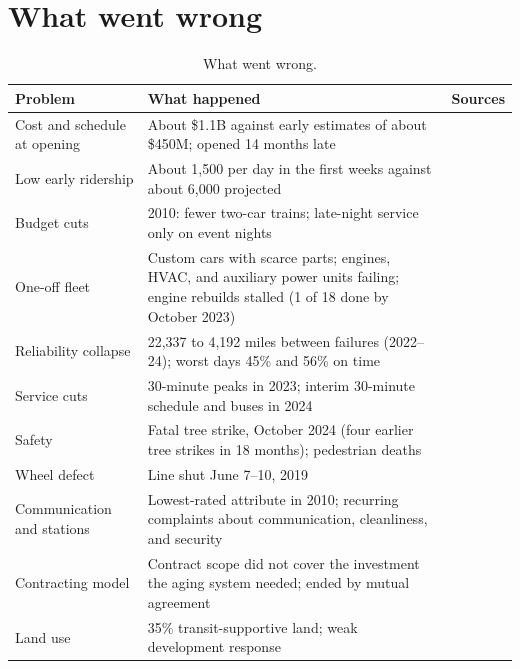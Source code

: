\documentclass[11pt]{article}
\begin{document}
\section{What went wrong}\label{sec:wrong}
\begin{table}[ht]\centering\small
\begin{tabularx}{\textwidth}{@{}p{3.6cm}L p{2.5cm}@{}}
\toprule
Problem & What happened & Sources \\
\midrule
Cost and schedule at opening & About \$1.1B against early estimates of about \$450M; opened 14 months late & \citep{camdenhistory2004,reason2004} \\
Low early ridership & About 1{,}500 per day in the first weeks against about 6{,}000 projected & \citep{reason2004} \\
Budget cuts & 2010: fewer two-car trains; late-night service only on event nights & \citep{njt2010fare} \\
One-off fleet & Custom cars with scarce parts; engines, HVAC, and auxiliary power units failing; engine rebuilds stalled (1 of 18 done by October 2023) & \citep{inquirer2023,singleton2025,njt2024interim} \\
Reliability collapse & 22{,}337 to 4{,}192 miles between failures (2022--24); worst days 45\% and 56\% on time & \citep{roinj2025,ols2027njt} \\
Service cuts & 30-minute peaks in 2023; interim 30-minute schedule and buses in 2024 & \citep{inquirer2023,njt2024interim} \\
Safety & Fatal tree strike, October 2024 (four earlier tree strikes in 18 months); pedestrian deaths & \citep{ntsb2025,singleton2025} \\
Wheel defect & Line shut June 7--10, 2019 & \citep{cbs2019wheels} \\
Communication and stations & Lowest-rated attribute in 2010; recurring complaints about communication, cleanliness, and security & \citep{dvrpc2013,singleton2025,centraljersey2025} \\
Contracting model & Contract scope did not cover the investment the aging system needed; ended by mutual agreement & \citep{njt2025alstom,railwaygazette2025} \\
Land use & 35\% transit-supportive land; weak development response & \citep{njtod2026,chatman2010} \\
\bottomrule
\end{tabularx}
\caption{What went wrong.}
\end{table}
\end{document}
